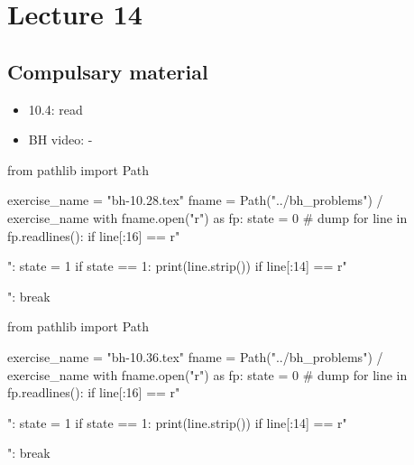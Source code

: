 \section{Lecture 14}

\subsection{Compulsary material}
\label{sec:compulsary-material}



\begin{itemize}
\item 10.4: read
\item BH video: -
\end{itemize}



\begin{pycode}
from pathlib import Path

exercise_name = "bh-10.28.tex"
fname = Path("../bh_problems") / exercise_name
with fname.open("r") as fp:
    state = 0  # dump
    for line in fp.readlines():
        if line[:16] == r"\begin{exercise}":
            state = 1
        if state == 1:
            print(line.strip())
        if line[:14] == r"\end{exercise}":
            break
\end{pycode}


\begin{pycode}
from pathlib import Path

exercise_name = "bh-10.36.tex"
fname = Path("../bh_problems") / exercise_name
with fname.open("r") as fp:
    state = 0  # dump
    for line in fp.readlines():
        if line[:16] == r"\begin{exercise}":
            state = 1
        if state == 1:
            print(line.strip())
        if line[:14] == r"\end{exercise}":
            break
\end{pycode}



